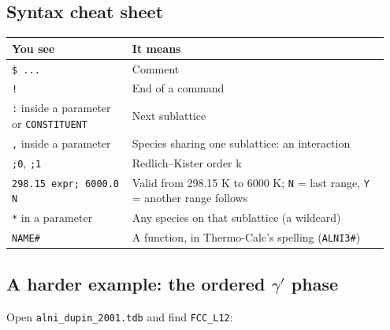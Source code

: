 \documentclass[12pt,a4paper]{article}
\begin{document}
\subsection*{Syntax cheat sheet}
\begingroup\small
\begin{longtable}{>{\raggedright\arraybackslash}p{0.300\linewidth}>{\raggedright\arraybackslash}p{0.647\linewidth}}
\toprule
\textbf{You see} & \textbf{It means} \\
\midrule
\endhead
\texttt{\$ .\allowbreak{}.\allowbreak{}.\allowbreak{}} & Comment \\
\texttt{!} & End of a command \\
\texttt{:} inside a parameter or \texttt{CONSTITUENT} & Next sublattice \\
\texttt{,\allowbreak{}} inside a parameter & Species sharing one sublattice: an interaction \\
\texttt{;0}, \texttt{;1} & Redlich--Kister order k \\
\texttt{298.\allowbreak{}15 expr; 6000.\allowbreak{}0 N} & Valid from 298.15 K to 6000 K; \texttt{N} = last range, \texttt{Y} = another range follows \\
\texttt{*} in a parameter & Any species on that sublattice (a wildcard) \\
\texttt{NAME\#} & A function, in Thermo-Calc's spelling (\texttt{ALNI3\#}) \\
\bottomrule
\end{longtable}
\endgroup

\subsection*{A harder example: the ordered \texorpdfstring{\(\gamma '\)}{gamma'} phase}
Open \texttt{alni\_\allowbreak{}dupin\_\allowbreak{}2001.\allowbreak{}tdb} and find \texttt{FCC\_\allowbreak{}L12}:
\end{document}
